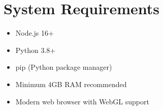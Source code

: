 \section{System Requirements}
\begin{itemize}
    \item Node.js 16+
    \item Python 3.8+
    \item pip (Python package manager)
    \item Minimum 4GB RAM recommended
    \item Modern web browser with WebGL support
\end{itemize}
